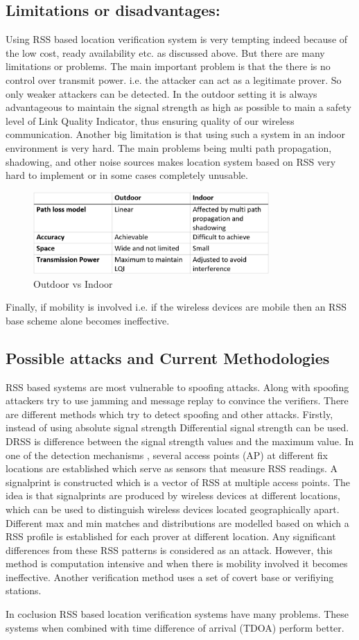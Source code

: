 \subsection{Limitations or disadvantages:} \label{rss_limitations}

Using RSS based location verification system is very tempting indeed because of the low cost, ready availability etc. as discussed above. But there are many limitations or problems. The main important problem is that the there is no control over transmit power. i.e. the attacker can act as a legitimate prover. So only weaker attackers can be detected. In the outdoor setting it is always advantageous to maintain the signal strength as high as possible to main a safety level of Link Quality Indicator, thus ensuring quality of our wireless communication. 
Another big limitation is that using such a system in an indoor environment is very hard. The main problems being multi path propagation, shadowing, and other noise sources makes location system based on RSS very hard to implement or in some cases completely unusable. 
\begin{figure}[htp]
    \centering
    \includegraphics[width=9cm]{strength_comp_table.png}
    \caption{Outdoor vs Indoor \cite{pu11}}
    \label{fig:strength_comp_table}
\end{figure}
Finally, if mobility is involved i.e. if the wireless devices are mobile then an RSS base scheme alone becomes ineffective.


\subsection{Possible attacks and Current Methodologies} \label{rss_attacks}
RSS based systems are most vulnerable to spoofing attacks. Along with spoofing attackers try to use jamming and message replay to convince the verifiers.
There are different methods which try to detect spoofing and other attacks. Firstly, instead of using absolute signal strength Differential signal strength can be used. DRSS is difference between the signal strength values and the maximum value. In one of the detection mechanisms \cite{chenbook}, several access points (AP) at different fix locations are established which serve as sensors that measure RSS readings. A signalprint is constructed which is a vector of RSS at multiple access points. The idea is that signalprints are produced by wireless devices at different locations, which can be used to distinguish wireless devices located geographically apart. Different max and min matches and distributions are modelled based on which a RSS profile is established for each prover at different location. Any significant differences from these RSS patterns is considered as an attack. However, this method is computation intensive and when there is mobility involved it becomes ineffective.  Another verification method uses a set of covert base or verifiying stations. 

In coclusion RSS based location verification systems have many problems. These systems when combined with time difference of arrival (TDOA) perform better.


